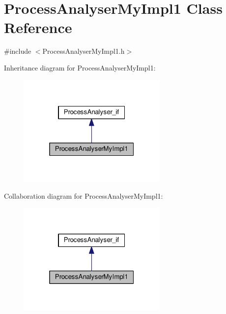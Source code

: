 \hypertarget{class_process_analyser_my_impl1}{\section{Process\-Analyser\-My\-Impl1 Class Reference}
\label{class_process_analyser_my_impl1}
}


{\ttfamily \#include $<$Process\-Analyser\-My\-Impl1.\-h$>$}



Inheritance diagram for Process\-Analyser\-My\-Impl1\-:
\nopagebreak
\begin{figure}[H]
\begin{center}
\leavevmode
\includegraphics[width=208pt]{class_process_analyser_my_impl1__inherit__graph}
\end{center}
\end{figure}


Collaboration diagram for Process\-Analyser\-My\-Impl1\-:
\nopagebreak
\begin{figure}[H]
\begin{center}
\leavevmode
\includegraphics[width=208pt]{class_process_analyser_my_impl1__coll__graph}
\end{center}
\end{figure}
